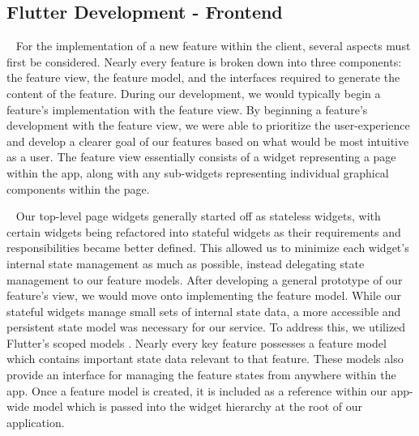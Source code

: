 \documentclass[10pt, a4paper]{article}
\begin{document}
\subsection{Flutter Development - Frontend}
\par ~ For the implementation of a new feature within the client, several aspects must first be considered. Nearly every feature is broken down into three components: the feature view, the feature model, and the interfaces required to generate the content of the feature. During our development, we would typically begin a feature's implementation with the feature view. By beginning a feature's development with the feature view, we were able to prioritize the user-experience and develop a clearer goal of our features based on what would be most intuitive as a user. The feature view essentially consists of a widget representing a page within the app, along with any sub-widgets representing individual graphical components within the page. 

\par ~ Our top-level page widgets generally started off as stateless widgets, with certain widgets being refactored into stateful widgets as their requirements and responsibilities became better defined. This allowed us to minimize each widget's internal state management as much as possible, instead delegating state management to our feature models. After developing a general prototype of our feature's view, we would move onto implementing the feature model. While our stateful widgets manage small sets of internal state data, a more accessible and persistent state model was necessary for our service. To address this, we utilized Flutter's scoped models \cite{one}. Nearly every key feature possesses a feature model which contains important state data relevant to that feature. These models also provide an interface for managing the feature states from anywhere within the app. Once a feature model is created, it is included as a reference within our app-wide model which is passed into the widget hierarchy at the root of our application.
\end{document}
